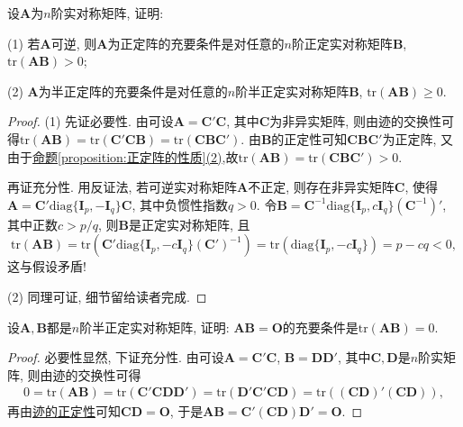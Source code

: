 \documentclass[../../main.tex]{subfiles}
\begin{document}
\begin{proposition}\label{proposition:正定和半正定阵关于迹的判定准则}
设$\boldsymbol{A}$为$n$阶实对称矩阵, 证明:

(1) 若$\boldsymbol{A}$可逆, 则$\boldsymbol{A}$为正定阵的充要条件是对任意的$n$阶正定实对称矩阵$\boldsymbol{B}$, $\text{tr}(\boldsymbol{A}\boldsymbol{B})>0$;

(2) $\boldsymbol{A}$为半正定阵的充要条件是对任意的$n$阶半正定实对称矩阵$\boldsymbol{B}$, $\text{tr}(\boldsymbol{A}\boldsymbol{B})\geq 0$.
\end{proposition}
\begin{proof}
(1) 先证必要性. 由可设$\boldsymbol{A}=\boldsymbol{C}'\boldsymbol{C}$, 其中$\boldsymbol{C}$为非异实矩阵, 则由迹的交换性可得$\text{tr}(\boldsymbol{A}\boldsymbol{B}) = \text{tr}(\boldsymbol{C}'\boldsymbol{C}\boldsymbol{B}) = \text{tr}(\boldsymbol{C}\boldsymbol{B}\boldsymbol{C}')$. 由$\boldsymbol{B}$的正定性可知$\boldsymbol{C}\boldsymbol{B}\boldsymbol{C}'$为正定阵, 又由于\hyperref[proposition:正定阵的性质]{命题\ref{proposition:正定阵的性质}(2)},故$\text{tr}(\boldsymbol{A}\boldsymbol{B}) = \text{tr}(\boldsymbol{C}\boldsymbol{B}\boldsymbol{C}')>0$.

再证充分性. 用反证法, 若可逆实对称矩阵$\boldsymbol{A}$不正定, 则存在非异实矩阵$\boldsymbol{C}$, 使得$\boldsymbol{A}=\boldsymbol{C}'\text{diag}\{\boldsymbol{I}_p, -\boldsymbol{I}_q\}\boldsymbol{C}$, 其中负惯性指数$q > 0$. 令$\boldsymbol{B}=\boldsymbol{C}^{-1}\text{diag}\{\boldsymbol{I}_p, c\boldsymbol{I}_q\}(\boldsymbol{C}^{-1})'$, 其中正数$c > p/q$, 则$\boldsymbol{B}$是正定实对称矩阵, 且
\[
\text{tr}(\boldsymbol{A}\boldsymbol{B}) = \text{tr}\left(\boldsymbol{C}'\text{diag}\{\boldsymbol{I}_p, -c\boldsymbol{I}_q\}(\boldsymbol{C}')^{-1}\right) = \text{tr}(\text{diag}\{\boldsymbol{I}_p, -c\boldsymbol{I}_q\}) = p - cq < 0,
\]
这与假设矛盾!

(2) 同理可证, 细节留给读者完成. 
\end{proof}

\begin{proposition}\label{proposition:A为实半正定阵AB=O的充要条件为tr(AB)=0}
设$\boldsymbol{A}, \boldsymbol{B}$都是$n$阶半正定实对称矩阵, 证明: $\boldsymbol{A}\boldsymbol{B}=\boldsymbol{O}$的充要条件是$\text{tr}(\boldsymbol{A}\boldsymbol{B}) = 0$.
\end{proposition}
\begin{proof}
必要性显然, 下证充分性. 由可设$\boldsymbol{A}=\boldsymbol{C}'\boldsymbol{C}$, $\boldsymbol{B}=\boldsymbol{D}\boldsymbol{D}'$, 其中$\boldsymbol{C}, \boldsymbol{D}$是$n$阶实矩阵, 则由迹的交换性可得
\begin{align*}
0 = \text{tr}(\boldsymbol{A}\boldsymbol{B}) = \text{tr}(\boldsymbol{C}'\boldsymbol{C}\boldsymbol{D}\boldsymbol{D}') = \text{tr}(\boldsymbol{D}'\boldsymbol{C}'\boldsymbol{C}\boldsymbol{D}) = \text{tr}\left((\boldsymbol{C}\boldsymbol{D})'(\boldsymbol{C}\boldsymbol{D})\right),
\end{align*}
再由\hyperref[proposition:零矩阵的充要条件]{迹的正定性}可知$\boldsymbol{C}\boldsymbol{D}=\boldsymbol{O}$, 于是$\boldsymbol{A}\boldsymbol{B}=\boldsymbol{C}'(\boldsymbol{C}\boldsymbol{D})\boldsymbol{D}'=\boldsymbol{O}$. 
\end{proof}
\end{document}
